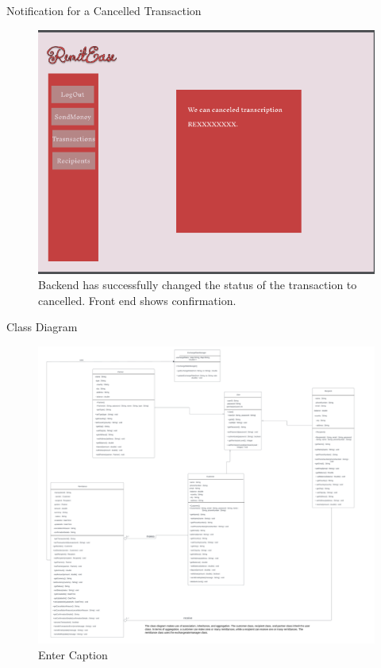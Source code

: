\documentclass{beamer}
\begin{document}
\begin{frame}{Notification for a Cancelled Transaction}
    \begin{figure}
        \centering
        \includegraphics[width=.7\linewidth]{MockUps/CancelConfirmation.PNG}
        \caption{Backend has successfully changed the status of the transaction  to cancelled. Front end shows confirmation.}
        \label{fig:enter-label}
    \end{figure}
\end{frame}


\begin{frame}{Class Diagram}
\begin{figure}
    \centering
    \includegraphics[width=1\linewidth]{Class Diagram.png}
    \caption{Enter Caption}
    \label{fig:enter-label}
\end{figure}
    
\end{frame}
\end{document}
